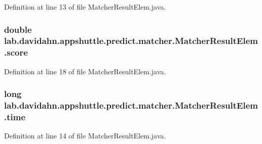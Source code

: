 \-Definition at line 13 of file \-Matcher\-Result\-Elem.\-java.

\hypertarget{classlab_1_1davidahn_1_1appshuttle_1_1predict_1_1matcher_1_1_matcher_result_elem_ab293b2be5e62ac6bb05eccfadd6bdcee}{
\subsubsection[{score}]{\setlength{\rightskip}{0pt plus 5cm}double {\bf lab.\-davidahn.\-appshuttle.\-predict.\-matcher.\-Matcher\-Result\-Elem.\-score}}}\label{classlab_1_1davidahn_1_1appshuttle_1_1predict_1_1matcher_1_1_matcher_result_elem_ab293b2be5e62ac6bb05eccfadd6bdcee}


\-Definition at line 18 of file \-Matcher\-Result\-Elem.\-java.

\hypertarget{classlab_1_1davidahn_1_1appshuttle_1_1predict_1_1matcher_1_1_matcher_result_elem_aea5d6f469e8d97abe0289ce27dfded99}{
\subsubsection[{time}]{\setlength{\rightskip}{0pt plus 5cm}long {\bf lab.\-davidahn.\-appshuttle.\-predict.\-matcher.\-Matcher\-Result\-Elem.\-time}}}\label{classlab_1_1davidahn_1_1appshuttle_1_1predict_1_1matcher_1_1_matcher_result_elem_aea5d6f469e8d97abe0289ce27dfded99}


\-Definition at line 14 of file \-Matcher\-Result\-Elem.\-java.

